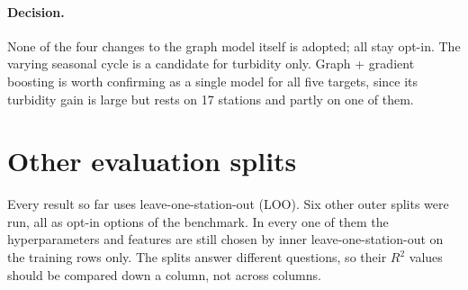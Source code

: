 \documentclass[11pt]{article}
\begin{document}
\paragraph{Decision.} None of the four changes to the graph model itself is adopted; all stay
opt-in. The varying seasonal cycle is a candidate for turbidity only. Graph + gradient boosting is worth confirming as a single model for all five targets, since
its turbidity gain is large but rests on 17 stations and partly on one of them.

\section{Other evaluation splits}
\label{sec:splits}

Every result so far uses leave-one-station-out (LOO). Six other outer splits were run, all as
opt-in options of the benchmark. In every one of them the hyperparameters and features are still
chosen by inner leave-one-station-out on the training rows only. The splits answer different
questions, so their $R^2$ values should be compared down a column, not across columns.
\end{document}
